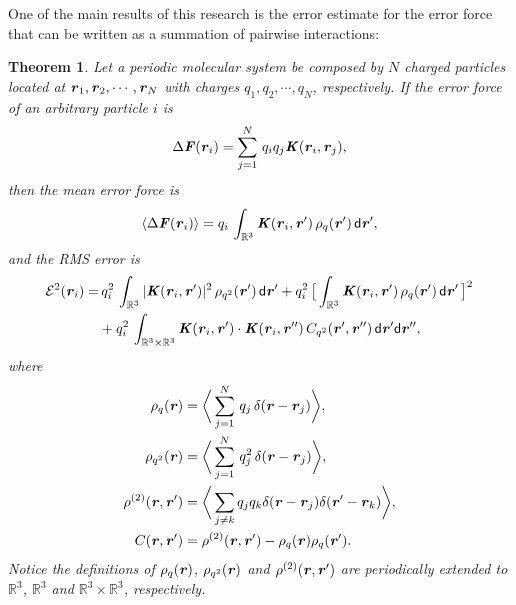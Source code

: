 \documentclass[aps,pre,preprint]{revtex4}
\renewcommand{\v}[1]{\textbf{\textit{#1}}}
\renewcommand{\d}[1]{\textsf{#1}}
\newtheorem{theorem}{Theorem}[section]
\begin{document}
One of the main results of this research is the error estimate for
the error force that can be written as a summation of
pairwise interactions:
\begin{theorem}\label{thm:tmp1}
  Let a periodic molecular system be composed by $N$ charged particles
  located at $\v r_1, \v r_2, \cdots, \v r_N$ with charges $q_1, q_2,
  \cdots, q_N$, respectively.
  If the error force of an arbitrary particle $i$ is
  \begin{align}\label{eqn:thm-error-force}
    \Delta \v F(\v r_i) =
    \sum_{j=1}^N\,q_iq_j \v K(\v r_i, \v r_j),
  \end{align}
  then the mean error force is
  \begin{align}\label{eqn:thm-meanf}
    \langle\Delta\v F(\v r_i)\rangle
    =q_i\, \int_{\mathbb R^3}\v K (\v r_i,\v r')\,\rho_q(\v r')\,\d d\v r',
  \end{align}
  and the RMS error is
  \begin{align}\nonumber
    \mathcal E^2 (\v r_i) 
    = &\,
    q_i^2\,\int_{\mathbb R^3}\vert\v K(\v r_i,\v r')\vert^2\,\rho_{q^2} (\v r')\,\d d\v r' + 
    q_i^2\,
    \big[
    \int_{\mathbb R^3}\v K(\v r_i,\v r')\,\rho_{q}(\v r')\,\d d\v r'
    \,\big]^2
    \\\label{eqn:thm-error}
    &+
    q_i^2\,\int_{\mathbb R^3\times\mathbb R^3}
    \v K(\v r_i,\v r')\cdot
    \v K(\v r_i,\v r'')\,
    C_{q^2}(\v r', \v r'')\,
    \d d\v r'\d d\v r'',
  \end{align}
  where
  \begin{align}\label{eqn:def-rhoq}
    \rho_q(\v r)
    &= 
    \bigg\langle
    \sum_{j = 1}^N
    \,q_j\,\delta(\v r - \v r_j)
    \bigg\rangle,\\\label{eqn:def-rhoq2}
    \rho_{q^2}(\v r)
    &= 
    \bigg\langle
    \sum_{j = 1}^N
    \,q^2_j\,\delta(\v r - \v r_j)
    \bigg\rangle,\\\label{eqn:def-rho2}
    \rho^{(2)}(\v r, \v r')
    &= 
    \bigg\langle
    \sum_{j\neq k}
    q_jq_k\delta(\v r-\v r_j)\delta(\v r'-\v r_k)
    \bigg\rangle,\\\label{eqn:def-c}
    C(\v r, \v r')
    &=
    \rho^{(2)}(\v r, \v r')    
    - \rho_q(\v r)\rho_q(\v r').
  \end{align}
  Notice the definitions of $\rho_q(\v r)$, $\rho_{q^2}(\v r)$ and
  $\rho^{(2)}(\v r, \v r')$ are periodically extended to
  $\mathbb{R}^3$, $\mathbb{R}^3$ and $\mathbb{R}^3\times\mathbb R^3$,
  respectively.
\end{theorem}
\end{document}
